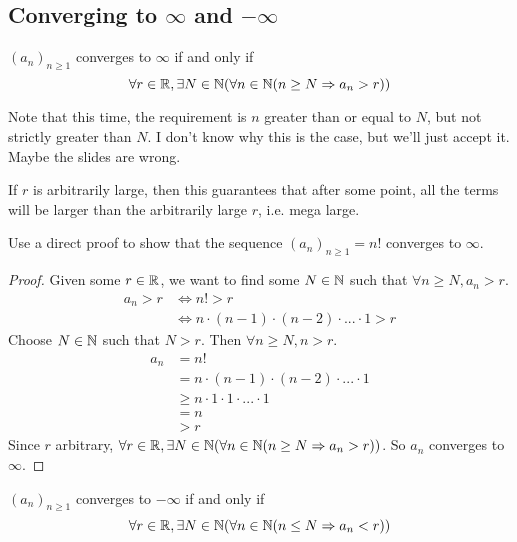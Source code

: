 
\subsection{Converging to $\infty$ and $-\infty$}
\begin{definition}
  $(a_n)_{n \geq 1}$ converges to $\infty$ if and only if
  \[
    \forall r \in \mathbb{R}, \exists N \in \mathbb{N} (\forall n \in \mathbb{N} (n \geq N \Rightarrow a_n > r))
  \]
\end{definition}
Note that this time, the requirement is $n$ greater than or equal to $N$, but not strictly greater than $N$. I don't know why this is the case, but we'll just accept it. Maybe the slides are wrong.
\begin{intuition}
  If $r$ is arbitrarily large, then this guarantees that after some point, all the terms will be larger than the arbitrarily large $r$, i.e. mega large.
\end{intuition}
\begin{eg}
  Use a direct proof to show that the sequence $(a_n)_{n \geq 1} = n!$ converges to $\infty$.
\end{eg}
\begin{proof}
  Given some $r \in \mathbb{R}$, we want to find some $N \in \mathbb{N}$ such that $\forall n \geq N, a_n > r$.
  \begin{align*}
    a_n > r &\iff n! > r \\
    &\iff n \cdot (n - 1) \cdot (n - 2) \cdot ... \cdot 1 > r
  \end{align*}
  Choose $N \in \mathbb{N}$ such that $N > r$. Then $\forall n \geq N, n > r$.
  \begin{align*}
    a_n &= n! \\
    &= n \cdot (n - 1) \cdot (n - 2) \cdot ... \cdot 1 \\
    &\geq n \cdot 1 \cdot 1 \cdot ... \cdot 1 \\
    &= n \\
    &> r 
  \end{align*}
  Since $r$ arbitrary, $\forall r \in \mathbb{R}, \exists N \in \mathbb{N} (\forall n \in \mathbb{N} (n \geq N \Rightarrow a_n > r))$. So $a_n$ converges to $\infty$.
\end{proof}
\begin{definition}
  $(a_n)_{n \geq 1}$ converges to $-\infty$ if and only if
  \[
    \forall r \in \mathbb{R}, \exists N \in \mathbb{N} (\forall n \in \mathbb{N} (n \leq N \Rightarrow a_n < r))
  \]
\end{definition}
